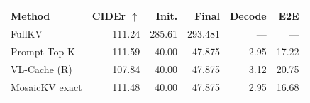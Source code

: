 \begin{tabular}{lrrrrr}
\toprule
Method & CIDEr $\uparrow$ & Init. & Final & Decode & E2E\\\midrule
FullKV & 111.24 & 285.61 & 293.481 & --- & ---\\
Prompt Top-K & 111.59 & 40.00 & 47.875 & 2.95 & 17.22\\
VL-Cache (R) & 107.84 & 40.00 & 47.875 & 3.12 & 20.75\\
MosaicKV exact & 111.48 & 40.00 & 47.875 & 2.95 & 16.68\\
\bottomrule
\end{tabular}
